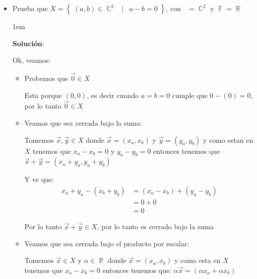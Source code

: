 \documentclass[12pt, fleqn]{report}                             %
\newenvironment{SmallIndentation}[1][0.75em]                    %
        {\begin{adjustwidth}{#1}{}\begin{footnotesize}}             %
        {\end{footnotesize}\end{adjustwidth}}                       %
\DeclareMathOperator \Space     {\quad}                         %
\DeclareMathOperator \MiniSpace {\;}                            %
\newcommand \Such           {\MiniSpace | \MiniSpace}           %
\theoremstyle{break}                                            %
\DeclareMathOperator \Reals        {\mathbb{R}}                 %
\DeclareMathOperator \Complexs     {\mathbb{C}}                 %
\DeclareMathOperator \GenericField {\mathbb{F}}                 %
\DeclareMathOperator \VectorSet    {\mathbb{V}}                 %
\DeclareMathOperator \VectorSpace  {\VectorSet_{\GenericField}} %
\newcommand{\Set}[1]            {\left\{ \; #1 \; \right\}}     %
\begin{document}
\begin{itemize}
                \clearpage

                \item 
                    Prueba que $X = \Set{(a, b) \in \Complexs^2 \Such a - b = 0}$, con 
                    $\VectorSpace = \Complexs^2$ y $\GenericField = \Reals$


                    \begin{SmallIndentation}[1em]
                        \textbf{Solución}:

                        Ok, veamos:
                        \begin{itemize}
                            
                            \item Probemos que $\vec 0 \in X$

                                Esta porque $(0, 0)$, es decir cuando $a = b = 0$ cumple que $0 - (0) = 0$, por
                                lo tanto $\vec 0 \in X$

                            \item
                                Veamos que sea cerrada bajo la suma:

                                Tomemos $\vec x, \vec y \in X$ donde $\vec x = (x_a, x_b)$ y $\vec y = (y_a, y_b)$
                                y como estan en $X$ tenemos que $x_a - x_b = 0$ y $y_a - y_b = 0$ entonces
                                tenemos que $\vec x + \vec y = (x_a + y_a, y_a + y_b)$

                                Y ve que:
                                \begin{align*}
                                    x_a + y_a - (x_b + y_b)
                                        &= (x_a - x_b) + (y_a - y_b)        \\
                                        &= 0 + 0                            \\
                                        &= 0
                                \end{align*}

                                Por lo tanto $\vec x + \vec y \in X$, por lo tanto es cerrado bajo la suma

                            \item
                                Veamos que sea cerrada bajo el producto por escalar:

                                Tomemos $\vec x \in X$ y $\alpha \in \Reals$ donde $\vec x = (x_a, x_b)$ y como
                                esta en $X$ tenemos que $x_a - x_b = 0$ entonces tenemos que:
                                $\alpha \vec x = (\alpha x_a + \alpha x_b)$


\end{itemize}
\end{SmallIndentation}
\end{itemize}
\end{document}
